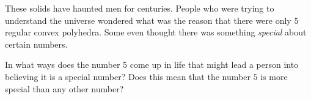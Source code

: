 These solids have haunted men for centuries. People who were trying to
understand the universe wondered what was the reason that there were
only 5 regular convex polyhedra. Some even thought there was something
\textit{special} about certain numbers.

\begin{ques}
In what ways does the number 5 come up in life that might lead a
person into believing it is a special number? Does this mean that the
number $5$ is more special than any other number?
\end{ques}
\QM

%
%

\newpage

